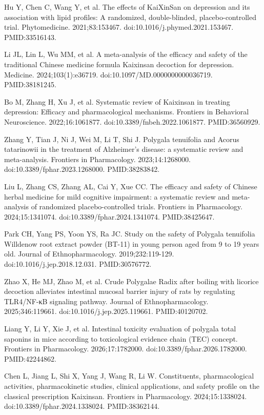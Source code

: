 \documentclass[12pt,oneside]{book}
\newcommand{\reff}[2]{\par\hangindent=7mm\hangafter=1\noindent[#1]\hspace{2mm}#2\par}
\begin{document}
\reff{40}{Hu Y, Chen C, Wang Y, et al. The effects of KaiXinSan on depression and its association with lipid profiles: A randomized, double-blinded, placebo-controlled trial. Phytomedicine. 2021;83:153467. doi:10.1016/j.phymed.2021.153467. PMID:33516143.}

\reff{41}{Li JL, Lin L, Wu MM, et al. A meta-analysis of the efficacy and safety of the traditional Chinese medicine formula Kaixinsan decoction for depression. Medicine. 2024;103(1):e36719. doi:10.1097/MD.0000000000036719. PMID:38181245.}

\reff{42}{Bo M, Zhang H, Xu J, et al. Systematic review of Kaixinsan in treating depression: Efficacy and pharmacological mechanisms. Frontiers in Behavioral Neuroscience. 2022;16:1061877. doi:10.3389/fnbeh.2022.1061877. PMID:36560929.}

\reff{43}{Zhang Y, Tian J, Ni J, Wei M, Li T, Shi J. Polygala tenuifolia and Acorus tatarinowii in the treatment of Alzheimer's disease: a systematic review and meta-analysis. Frontiers in Pharmacology. 2023;14:1268000. doi:10.3389/fphar.2023.1268000. PMID:38283842.}

\reff{44}{Liu L, Zhang CS, Zhang AL, Cai Y, Xue CC. The efficacy and safety of Chinese herbal medicine for mild cognitive impairment: a systematic review and meta-analysis of randomized placebo-controlled trials. Frontiers in Pharmacology. 2024;15:1341074. doi:10.3389/fphar.2024.1341074. PMID:38425647.}

\reff{45}{Park CH, Yang PS, Yoon YS, Ra JC. Study on the safety of Polygala tenuifolia Willdenow root extract powder (BT-11) in young person aged from 9 to 19 years old. Journal of Ethnopharmacology. 2019;232:119-129. doi:10.1016/j.jep.2018.12.031. PMID:30576772.}

\reff{46}{Zhao X, He MJ, Zhao M, et al. Crude Polygalae Radix after boiling with licorice decoction alleviates intestinal mucosal barrier injury of rats by regulating TLR4/NF-κB signaling pathway. Journal of Ethnopharmacology. 2025;346:119661. doi:10.1016/j.jep.2025.119661. PMID:40120702.}

\reff{47}{Liang Y, Li Y, Xie J, et al. Intestinal toxicity evaluation of polygala total saponins in mice according to toxicological evidence chain (TEC) concept. Frontiers in Pharmacology. 2026;17:1782000. doi:10.3389/fphar.2026.1782000. PMID:42244862.}

\reff{48}{Chen L, Jiang L, Shi X, Yang J, Wang R, Li W. Constituents, pharmacological activities, pharmacokinetic studies, clinical applications, and safety profile on the classical prescription Kaixinsan. Frontiers in Pharmacology. 2024;15:1338024. doi:10.3389/fphar.2024.1338024. PMID:38362144.}
\end{document}
